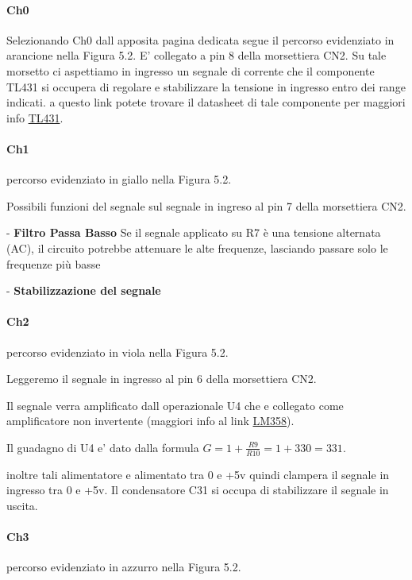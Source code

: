 \documentclass[12pt,a4paper]{report}
\begin{document}
\paragraph{Ch0}
Selezionando Ch0 dall apposita pagina dedicata segue il percorso evidenziato in arancione nella Figura 5.2.
E' collegato a pin 8 della morsettiera CN2.
Su tale morsetto ci aspettiamo in ingresso un segnale di corrente che il componente TL431 si occupera di regolare e stabilizzare la tensione in ingresso entro dei range indicati.
a questo link potete trovare il datasheet di tale componente per maggiori info \href{https://www.ti.com/lit/ds/symlink/tl431.pdf}{TL431}.

\paragraph{Ch1}
percorso evidenziato in giallo nella Figura 5.2.

Possibili funzioni del segnale sul segnale in ingreso al pin 7 della morsettiera CN2.

- \textbf{Filtro Passa Basso}
Se il segnale applicato su R7 è una tensione alternata (AC), il circuito potrebbe attenuare le alte frequenze, lasciando passare solo le frequenze più basse

- \textbf{Stabilizzazione del segnale}

\paragraph{Ch2}
percorso evidenziato in viola nella Figura 5.2.

Leggeremo il segnale in ingresso al pin 6 della morsettiera CN2.

Il segnale verra amplificato dall operazionale U4 che e collegato come amplificatore non invertente (maggiori info al link \href{https://elettronicasemplice.weebly.com/amplificatore-operazionale-non-invertente.html}{LM358}).

Il guadagno di U4 e' dato dalla formula $G = 1 + \frac{R9}{R10}= 1+330 = 331 $.

inoltre tali alimentatore e alimentato tra 0 e +5v quindi clampera il segnale in ingresso tra 0 e +5v.
Il condensatore C31 si occupa di stabilizzare il segnale in uscita.

\paragraph{Ch3}
percorso evidenziato in azzurro nella Figura 5.2.
\end{document}
